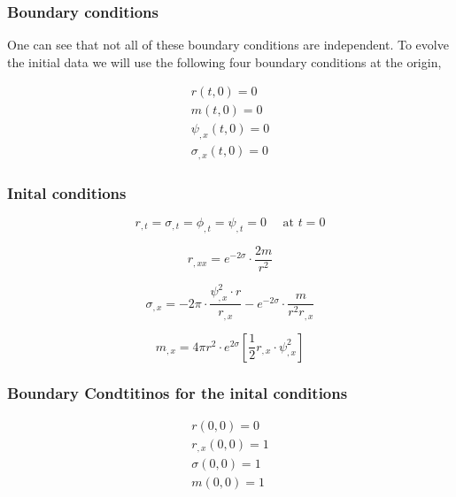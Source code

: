 \documentclass[hyperref={bookmarks=false},aspectratio=169]{beamer}
\begin{document}
\begin{frame}
  \frametitle{Boundary conditions}

  One can see that not all of these boundary conditions are independent. To evolve the initial data we will use the following four boundary conditions at the origin,

  \begin{eqnarray*}
    r(t,0) = 0 \\
    m(t,0) =0 \\
    \psi_{,x}(t,0) = 0\\
    \sigma_{,x}(t,0) = 0
  \end{eqnarray*}
\end{frame}


\begin{frame}
  \frametitle{Inital conditions}

  \begin{equation}
    r_{, t}=\sigma_{, t}=\phi_{, t}=\psi_{, t}=0 \quad \text { at } t=0
    \label{eqn:time_symmetric_boundary_conditinons}
  \end{equation}

  \begin{equation}
    r_{, x x}=e^{-2 \sigma} \cdot \frac{2 m}{r^{2}}
    \label{eqn:r_chap3}
  \end{equation}


  \begin{equation}
    \sigma_{, x}= -2 \pi \cdot  \frac{\psi_{, x}^{2} \cdot r}{r_{,x}}- e^{-2 \sigma} \cdot \frac{ m}{r^{2}r_{, x}}
    \label{eqn:sigma_chap3}
  \end{equation}

  \begin{equation}
    m_{, x}=4 \pi r^{2} \cdot e^{2 \sigma}\left[\frac{1}{2} r_{, x} \cdot \psi_{, x}^{2} \right]
  \end{equation}


\end{frame}


\begin{frame}
  \frametitle{Boundary Condtitinos for the inital conditions}
  \begin{eqnarray*}
    r(0 ,0) = 0  \\
    r_{,x}(0 ,0) = 1  \\
    \sigma(0 ,0) = 1  \\
    m(0 ,0) = 1
  \end{eqnarray*}
\end{frame}
\end{document}
